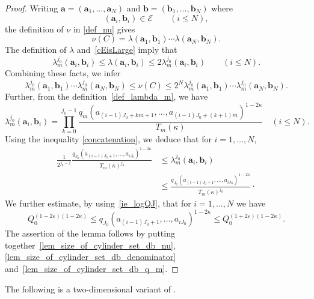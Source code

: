 \documentclass[12pt, reqno]{amsart}
\theoremstyle{definition}
\theoremstyle{remark}
\numberwithin{equation}{section}
\def\kap{{\kappa}}
\def\lam{{\lambda}} \def\Lam{{\Lambda}} \def\Lamtil{{\widetilde \Lambda}}
\def\ls{\leqslant} \def\gs{\geqslant}
\def\leq{\leqslant}
\def \ba {\mathbf a}
\def \bb {\mathbf b}
\def \cE {\mathcal E}
\begin{document}
\begin{proof}
Writing $\ba = (\ba_1,  \ldots, \ba_N)$ and $\bb = (\bb_1, \ldots, \bb_N)$ where 
\[
(\ba_i,\bb_i) \in \cE 
\qquad (i\ls N),
\]
the definition of $\nu$ in \eqref{def_nu} gives 
\[
\nu(C) = \lambda(\ba_1,\bb_1)
\cdots \lambda(\ba_N, \bb_N).
\]
The definition of $\lambda$  and~\eqref{cEisLarge} imply that   
\begin{equation*} \label{lambda_and_lambda_m0_are_comparable}
\lambda_m^{j_0}(\ba_i,\bb_i) \leq \lambda(\ba_i,\bb_i)\leq 2\lambda_m^{j_0}(\ba_i,\bb_i)  \qquad ( i\ls N).
\end{equation*}
Combining these facts, we infer
\begin{equation} \label{lem_size_of_cylinder_set_db_nu}
\lambda_m^{j_0 }(\ba_1, \bb_1)\cdots   \lambda_m^{j_0}(\ba_N,\bb_N) \leq \nu(C)\leq 2^N  \lambda_m^{j_0 }(\ba_1, \bb_1)\cdots   \lambda_m^{j_0}(\ba_N,\bb_N).
\end{equation}
Further, from the definition~\eqref{def_lambda_m}, we have
\begin{equation*} 
\lambda_m^{j_0 }(\ba_i, \bb_i) = \prod_{k=0}^{j_0-1} \frac{q_m(a_{(i-1)J_0+km+1},\dots,a_{(i-1)J_0+(k+1)m})^{1-2\kap}}{T_m(\kap)}      \quad (i\ls N).
\end{equation*}
Using the inequality \eqref{concatenation}, we deduce that for $i=1, \dots, N$,
\begin{equation}
\begin{aligned}
	\label{lem_size_of_cylinder_set_db_denominator}
	\frac{1}{2^{j_0-1}} \frac{ q_{J_0}(a_{(i-1)J_0+1},\dots,a_{iJ_0})^{1-2\kap}}{T_m(\kap)^{j_0}} &\leq  \lam_m^{j_0}(\ba_i, \bb_i) 
	\\& \leq  \frac{q_{J_0}(a_{(i-1)J_0+1},\dots,a_{iJ_0})^{1-2\kap}}{T_m(\kap)^{j_0}} \cdot 
\end{aligned}
\end{equation}
We further estimate, by using~\eqref{ie_logQJ}, that for $i=1, \dots, N$ we have
\begin{equation} \label{lem_size_of_cylinder_set_db_q_m}
Q_0^{(1-2\varepsilon)(1-2\kap)}
\leq
q_{J_0}(a_{(i-1)J_0+1},\dots,a_{iJ_0})^{1-2\kap}\leq Q_0^{(1+2\varepsilon)(1-2\kap)}.
\end{equation}
The assertion of the lemma follows by putting together~\eqref{lem_size_of_cylinder_set_db_nu}, \eqref{lem_size_of_cylinder_set_db_denominator} and~\eqref{lem_size_of_cylinder_set_db_q_m}.
\end{proof}

The following is a two-dimensional variant of \cite[Proposition 4.1]{QR2003}.  
\end{document}
